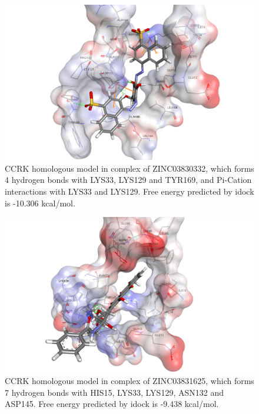 \begin{figure}
\centering
\includegraphics[width=\linewidth]{../ccrk/1HCL-ZINC03830332.png}
\caption{CCRK homologous model in complex of ZINC03830332, which forms 4 hydrogen bonds with LYS33, LYS129 and TYR169, and Pi-Cation interactions with LYS33 and LYS129. Free energy predicted by idock is -10.306 kcal/mol.}
\label{Case:1HCL-ZINC03830332}
\end{figure}

\begin{figure}
\centering
\includegraphics[width=\linewidth]{../ccrk/1HCL-ZINC03831625.png}
\caption{CCRK homologous model in complex of ZINC03831625, which forms 7 hydrogen bonds with HIS15, LYS33, LYS129, ASN132 and ASP145. Free energy predicted by idock is -9.438 kcal/mol.}
\label{Case:1HCL-ZINC03831625}
\end{figure}


\chapterend
